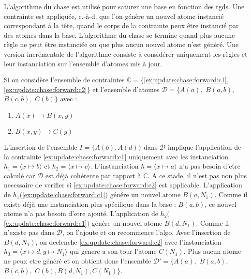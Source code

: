 L'algorithme du \gls{chase} \cite{ahoTheoryJoinsRelational1979,maierTestingImplicationsData1979} est utilisé pour saturer une base en fonction des \glspl{tgd}.
Une contrainte est appliquée, c.-à-d. que l'on génère un nouvel atome instancié correspondant à la tête, quand le corps de la contrainte peux être instancié par des atomes dans la base.
L'algorithme du \gls{chase} se termine quand plus aucune règle ne peut être instanciée ou que plus aucun nouvel atome n'est généré.
Une version incrémentale de l'algorithme consiste à considérer uniquement les règles et leur instanciation sur l'ensemble d'atomes mis à jour.

\begin{example}
    \label{ex:update:chase:forward}
    Si on considère l'ensemble de contraintes $\mathbb{C} = \{$\ref{ex:update:chase:forward:c1}, \ref{ex:update:chase:forward:c2}$\}$ et l'ensemble d'atomes $\mathcal{D} = \{A(a),$ $B(a, b),$ $B(c, b),$ $C(b)\}$ avec :

    \begin{multicols}{2}
        \begin{enumerate}[label=\textbf{$c_\arabic*$ :},ref=$c_\arabic*$]
            \centering
            \item $A(x) \to B(x, y)$ \label{ex:update:chase:forward:c1}
            \item $B(x, y) \to C(y)$ \label{ex:update:chase:forward:c2}
        \end{enumerate}
    \end{multicols}

    L'insertion de l'ensemble $I = \{A(b), A(d)\}$ dans $\mathcal{D}$ implique l'application de la contrainte \ref{ex:update:chase:forward:c1} uniquement avec les instanciation $h_1 = \langle x \mapsto b \rangle$ et $h_2 = \langle x \mapsto c \rangle$.
    L'instanciation $h = \langle x \mapsto a \rangle$ n'a pas besoin d'etre calculé car $\mathcal{D}$ est déjà cohérente par rapport à $\mathbb{C}$.
    A ce stade, il n'est pas non plus necessaire de verifier si \ref{ex:update:chase:forward:c2} est applicable.
    L'application de $h_1($\ref{ex:update:chase:forward:c1}$)$ génére un nouvel atome $B(a, N_1)$.
    Comme il existe déjà une instanciation plus spécifique dans la base : $B(a, b)$, ce nouvel atome n'a pas besoin d'etre ajouté.
    L'application de $h_2($\ref{ex:update:chase:forward:c1}$)$ génére un nouvel atome $B(d, N_1)$.
    Comme il n'existe pas dans $\mathcal{D}$, on l'ajoute et on recommence l'algo.
    Avec l'insertion de $B(d, N_1)$, on declenche \ref{ex:update:chase:forward:c2} avec l'instanciation $h_3 = \langle x \mapsto d, y \mapsto N_1 \rangle$ qui genere a son tour l'atome $C(N_1)$.
    Plus aucun atome ne peux etre généré et on obtient donc l'ensemble $\mathcal{D}' = \{A(a),$ $B(a, b),$ $B(c, b),$ $C(b), B(d, N_1), C(N_1)\}$.
\end{example}

